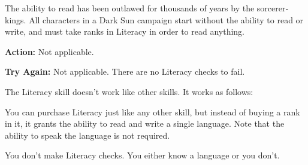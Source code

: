 
The ability to read has been outlawed for thousands of years by the sorcerer‐kings. All characters in a {\tableheader Dark Sun} campaign start without the ability to read or write, and must take ranks in Literacy in order to read anything.

\textbf{Action:} Not applicable.

\textbf{Try Again:} Not applicable. There are no Literacy checks to fail.

The Literacy skill doesn’t work like other skills. It works as follows:

\begin{itemize*}
\item You can purchase Literacy just like any other skill, but instead of buying a rank in it, it grants the ability to read and write a single language. Note that the ability to speak the language is not required.
\item You don’t make Literacy checks. You either know a language or you don’t.
\end{itemize*}

